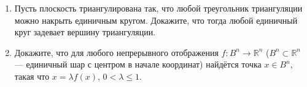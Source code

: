 \documentclass[12pt]{article}
\renewcommand{\le}{\leqslant}
\begin{document}
\begin{enumerate}
%
%
%
%
%
%
%
%

  \item Пусть плоскость триангулирована так, что любой треугольник триангуляции можно накрыть единичным кругом. Докажите, что тогда любой единичный круг задевает вершину триангуляции.
      
  \item Докажите, что для любого непрерывного отображения $f : B^n \to \mathbb{R}^n$ ($B^n \subset \mathbb{R}^n$ --- единичный шар с центром в начале координат) найдётся точка $x \in B^n$, такая что $x = \lambda f(x)$, $0 < \lambda \le 1$.

\end{enumerate}
\end{document}
